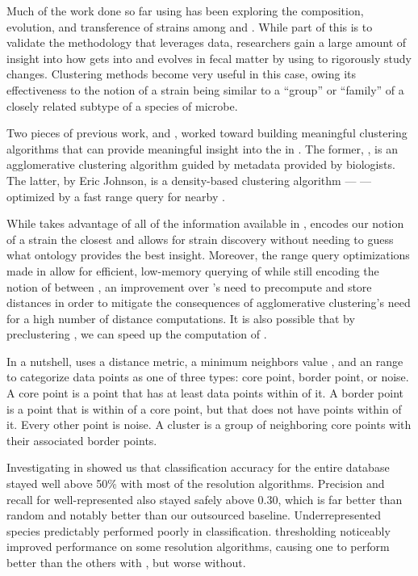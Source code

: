 Much of the work done so far using \cplop{} has been exploring the composition, evolution, and transference of strains among \hosts{} and \spec{}.
While part of this is to validate the \mst{} methodology that leverages \cplop{} data, researchers gain a large amount of insight into how \ecoli{} gets into and evolves in fecal matter by using \pyros{} to rigorously study changes.
Clustering methods become very useful in this case, owing its effectiveness to the notion of a strain being similar to a ``group'' or ``family'' of a closely related subtype of a species of microbe.

Two pieces of previous work, \cite{montana2013ontological, montana2013algorithms} and \cite{johnson2015density}, worked toward building meaningful clustering algorithms that can provide meaningful insight into the \ecoli{} \isols{} in \cplop{}.
The former, \ohclust{}, is an agglomerative clustering algorithm guided by metadata provided by biologists.
The latter, by Eric Johnson, is a density-based clustering algorithm --- \dbscan{} --- optimized by a fast range query for nearby \isols{}.

While \ohclust{} takes advantage of all of the information available in \cplop{}, \dbscan{} encodes our notion of a strain the closest and allows for strain discovery without needing to guess what ontology provides the best insight.
Moreover, the range query optimizations made in \cite{johnson2015density} allow for efficient, low-memory querying of \isols{} while still encoding the notion of \pearson{} between \isols{}, an improvement over \ohclust{}'s need to precompute and store distances in order to mitigate the consequences of agglomerative clustering's need for a high number of distance computations.
It is also possible that by preclustering \isols{}, we can speed up the computation of \krap{}.

In a nutshell, \dbscan{} uses a distance metric, a minimum neighbors value \minneigh{}, and an \eps{} range to categorize data points as one of three types: core point, border point, or noise.
A core point is a point that has at least \minneigh{} data points within \eps{} of it. 
A border point is a point that is within \eps{} of a core point, but that does not have \minneigh{} points within \eps{} of it. Every other point is noise. 
A cluster is a group of neighboring core points with their associated border points.

Investigating \krap{} in \cite{DBLP:conf/bibm/McGovernDKBVG15} showed us that classification accuracy for the entire database stayed well above 50\% with most of the resolution algorithms.
Precision and recall for well-represented \spec{} also stayed safely above 0.30, which is far better than random and notably better than our outsourced baseline.
Underrepresented species predictably performed poorly in classification.
\a{} thresholding noticeably improved performance on some resolution algorithms, causing one to perform better than the others with \a{}, but worse without.

